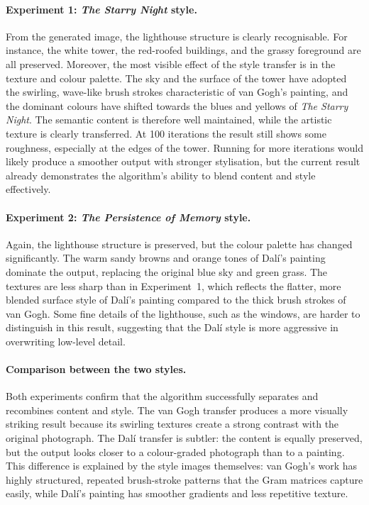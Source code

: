 \documentclass{article}
\begin{document}
\paragraph{Experiment 1: \textit{The Starry Night} style.}
From the generated image, the lighthouse structure is clearly recognisable. For instance, the white tower,
the red-roofed buildings, and the grassy foreground are all preserved. Moreover, the
most visible effect of the style transfer is in the texture and colour palette. The
sky and the surface of the tower have adopted the swirling, wave-like brush
strokes characteristic of van Gogh's painting, and the dominant colours have
shifted towards the blues and yellows of \textit{The Starry Night}. The
semantic content is therefore well maintained, while the artistic texture is
clearly transferred. At 100 iterations the result still shows some roughness,
especially at the edges of the tower. Running for more iterations would likely 
produce a smoother output with stronger stylisation, but the current result already 
demonstrates the algorithm's ability to blend content and style effectively.

\paragraph{Experiment 2: \textit{The Persistence of Memory} style.}
Again, the lighthouse structure is preserved, but the colour
palette has changed significantly. The warm sandy browns and orange tones of
Dalí's painting dominate the output, replacing the original blue sky and green
grass. The textures are less sharp than in Experiment~1, which reflects the
flatter, more blended surface style of Dalí's painting compared to the
thick brush strokes of van Gogh. Some fine details of the lighthouse, such as
the windows, are harder to distinguish in this result, suggesting that the Dalí
style is more aggressive in overwriting low-level detail.

\paragraph{Comparison between the two styles.}
Both experiments confirm that the algorithm successfully separates and
recombines content and style. The van Gogh transfer produces a more visually
striking result because its swirling textures create a strong contrast with the
original photograph. The Dalí transfer is subtler: the content is equally
preserved, but the output looks closer to a colour-graded photograph than to a
painting. This difference is explained by the style images themselves: van
Gogh's work has highly structured, repeated brush-stroke patterns that the Gram
matrices capture easily, while Dalí's painting has smoother gradients and less
repetitive texture.
\end{document}
